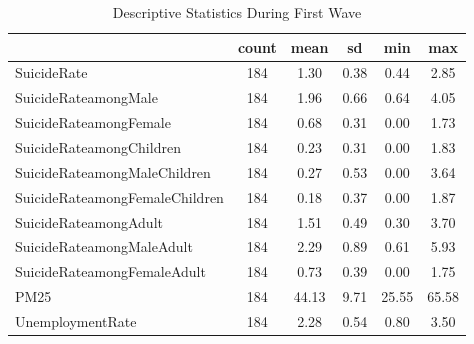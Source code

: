 \begin{table}[htbp]\centering
\def\sym#1{\ifmmode^{#1}\else\(^{#1}\)\fi}
\caption{Descriptive Statistics During First Wave}
\begin{tabular}{l*{1}{ccccc}}
\hline\hline
            &       count&        mean&          sd&         min&         max\\
\hline
SuicideRate &         184&        1.30&        0.38&        0.44&        2.85\\
SuicideRateamongMale&         184&        1.96&        0.66&        0.64&        4.05\\
SuicideRateamongFemale&         184&        0.68&        0.31&        0.00&        1.73\\
SuicideRateamongChildren&         184&        0.23&        0.31&        0.00&        1.83\\
SuicideRateamongMaleChildren&         184&        0.27&        0.53&        0.00&        3.64\\
SuicideRateamongFemaleChildren&         184&        0.18&        0.37&        0.00&        1.87\\
SuicideRateamongAdult&         184&        1.51&        0.49&        0.30&        3.70\\
SuicideRateamongMaleAdult&         184&        2.29&        0.89&        0.61&        5.93\\
SuicideRateamongFemaleAdult&         184&        0.73&        0.39&        0.00&        1.75\\
PM25        &         184&       44.13&        9.71&       25.55&       65.58\\
UnemploymentRate&         184&        2.28&        0.54&        0.80&        3.50\\
\hline\hline
\end{tabular}
\end{table}
